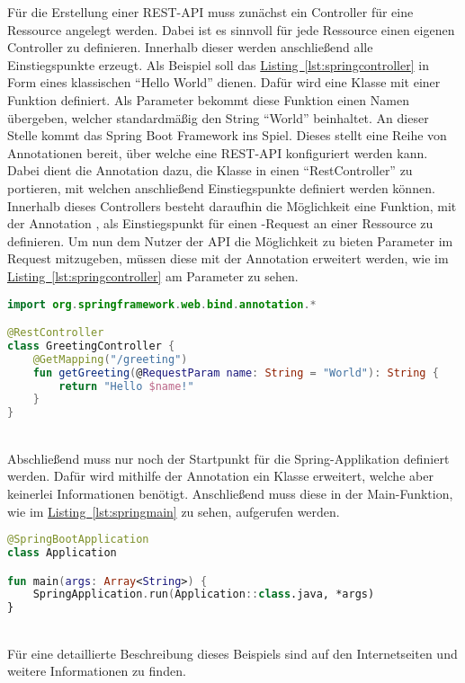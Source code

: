 Für die Erstellung einer \gls{REST}-\gls{API} muss zunächst ein Controller für eine Ressource angelegt werden. Dabei ist es sinnvoll für jede Ressource einen eigenen Controller zu definieren. Innerhalb dieser werden anschließend alle Einstiegspunkte erzeugt. Als Beispiel soll das \hyperref[lst:springcontroller]{Listing~\ref{lst:springcontroller}} in Form eines klassischen \enquote{Hello World} dienen. Dafür wird eine Klasse  mit einer Funktion  definiert. Als Parameter bekommt diese Funktion einen Namen übergeben, welcher standardmäßig den String \enquote{World} beinhaltet. An dieser Stelle kommt das Spring Boot Framework ins Spiel. Dieses stellt eine Reihe von Annotationen bereit, über welche eine \gls{REST}-\gls{API} konfiguriert werden kann. Dabei dient die Annotation  dazu, die Klasse  in einen \enquote{RestController} zu portieren, mit welchen anschließend Einstiegspunkte definiert werden können. Innerhalb dieses Controllers besteht daraufhin die Möglichkeit eine Funktion, mit der Annotation , als Einstiegspunkt für einen -Request an einer Ressource zu definieren. Um nun dem Nutzer der \gls{API} die Möglichkeit zu bieten Parameter im Request mitzugeben, müssen diese mit der Annotation  erweitert werden, wie im \hyperref[lst:springcontroller]{Listing~\ref{lst:springcontroller}} am Parameter  zu sehen.\\
\begin{lstlisting}[style=lstStyleFramed, language=Kotlin, caption={Beispiel: Spring Controller}, label=lst:springcontroller, float]
import org.springframework.web.bind.annotation.*

@RestController
class GreetingController {
	@GetMapping("/greeting")
	fun getGreeting(@RequestParam name: String = "World"): String {
		return "Hello $name!"
	}
}
\end{lstlisting}
\\
Abschließend muss nur noch der Startpunkt für die Spring-Applikation definiert werden. Dafür wird mithilfe der Annotation  ein Klasse erweitert, welche aber keinerlei Informationen benötigt. Anschließend muss diese in der Main-Funktion, wie im \hyperref[lst:springmain]{Listing~\ref{lst:springmain}} zu sehen, aufgerufen werden.
\\
\begin{lstlisting}[style=lstStyleFramed, language=Kotlin, caption={Beispiel: Spring Application Class}, label=lst:springmain, float]
@SpringBootApplication
class Application

fun main(args: Array<String>) {
	SpringApplication.run(Application::class.java, *args)
}
\end{lstlisting}
\\
Für eine detaillierte Beschreibung dieses Beispiels sind auf den Internetseiten \cite{springTutorialKotlin} und \cite{springTutorial} weitere Informationen zu finden.

